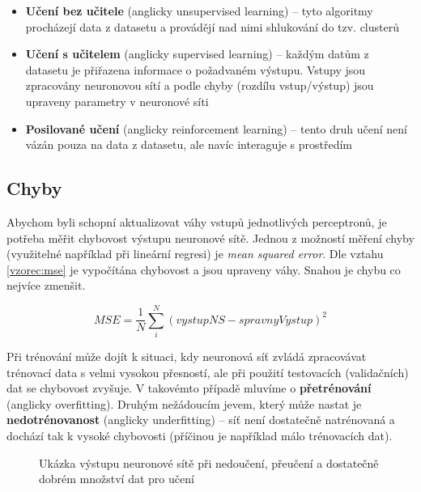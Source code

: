 \begin{itemize}
  \item \textbf{Učení bez učitele} (anglicky unsupervised learning) -- tyto algoritmy procházejí data z datasetu a provádějí nad nimi shlukování do tzv. clusterů
  \item \textbf{Učení s učitelem} (anglicky supervised learning) -- každým datům z datasetu je přiřazena informace o požadvaném výstupu. Vstupy jsou zpracovány neuronovou sítí a podle chyby (rozdílu vstup/výstup) jsou upraveny parametry v neuronové síti
  \item \textbf{Posilované učení} (anglicky reinforcement learning) -- tento druh učení není vázán pouza na data z datasetu, ale navíc interaguje s prostředím
\end{itemize}

\subsection*{Chyby}
Abychom byli schopní aktualizovat váhy vstupů jednotlivých perceptronů, je potřeba měřit chybovost výstupu neuronové sítě. Jednou z možností měření chyby (využitelné například při lineární regresi) je \emph{mean squared error}. Dle vztahu \ref{vzorec:mse} je vypočítána chybovost a jsou upraveny váhy. Snahou je chybu co nejvíce zmenšit.

\begin{equation}
  \label{vzorec:mse}
  MSE = \frac{1}{N} \sum_{i}^{N} (vystupNS - spravnyVystup)^2
\end{equation}

Při trénování může dojít k situaci, kdy neuronová síť zvládá zpracovávat trénovací data s velmi vysokou přesností, ale při použití testovacích (validačních) dat se chybovost zvyšuje. V takovémto případě mluvíme o \textbf{přetrénování} (anglicky overfitting). Druhým nežádoucím jevem, který může nastat je \textbf{nedotrénovanost} (anglicky underfitting) -- síť není dostatečně natrénovaná a dochází tak k vysoké chybovosti (příčinou je například málo trénovacích dat).


\begin{figure}[H]
  \begin{center}
  \label{obrazek:fitting}
  \caption{Ukázka výstupu neuronové sítě při nedoučení, přeučení a dostatečně dobrém množství dat pro učení}
  \end{center}
\end{figure}


